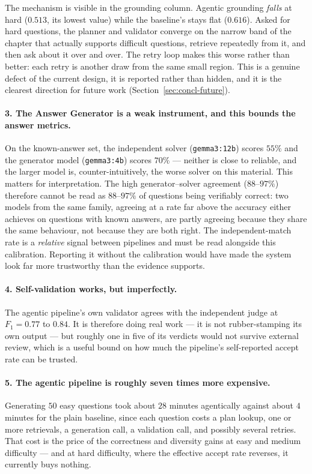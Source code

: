The mechanism is visible in the grounding column. Agentic grounding \emph{falls} at
hard ($0.513$, its lowest value) while the baseline's stays flat ($0.616$). Asked for
hard questions, the planner and validator converge on the narrow band of the chapter
that actually supports difficult questions, retrieve repeatedly from it, and then ask
about it over and over. The retry loop makes this worse rather than better: each
retry is another draw from the same small region. This is a genuine defect of the
current design, it is reported rather than hidden, and it is the clearest direction
for future work (Section~\ref{sec:concl-future}).

\paragraph{3. The Answer Generator is a weak instrument, and this bounds the answer
metrics.} On the known-answer set, the independent solver (\texttt{gemma3:12b})
scores $55\%$ and the generator model (\texttt{gemma3:4b}) scores $70\%$ --- neither
is close to reliable, and the larger model is, counter-intuitively, the worse solver
on this material. This matters for interpretation. The high generator--solver
agreement ($88$--$97\%$) therefore cannot be read as $88$--$97\%$ of questions being
verifiably correct: two models from the same family, agreeing at a rate far above the
accuracy either achieves on questions with known answers, are partly agreeing because
they share the same behaviour, not because they are both right. The
independent-match rate is a \emph{relative} signal between pipelines and must be read
alongside this calibration. Reporting it without the calibration would have made the
system look far more trustworthy than the evidence supports.

\paragraph{4. Self-validation works, but imperfectly.} The agentic pipeline's own
validator agrees with the independent judge at $F_1 = 0.77$ to $0.84$. It is
therefore doing real work --- it is not rubber-stamping its own output --- but roughly
one in five of its verdicts would not survive external review, which is a useful
bound on how much the pipeline's self-reported accept rate can be trusted.

\paragraph{5. The agentic pipeline is roughly seven times more expensive.} Generating
$50$ easy questions took about $28$ minutes agentically against about $4$ minutes for
the plain baseline, since each question costs a plan lookup, one or more retrievals,
a generation call, a validation call, and possibly several retries. That cost is the
price of the correctness and diversity gains at easy and medium difficulty --- and at
hard difficulty, where the effective accept rate reverses, it currently buys nothing.

